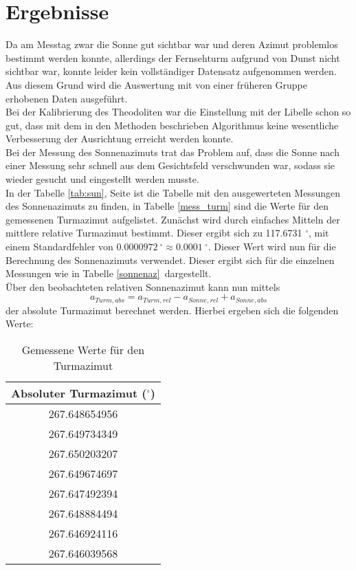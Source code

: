 \section{Ergebnisse}
Da am Messtag zwar die Sonne gut sichtbar war und deren Azimut problemlos bestimmt werden konnte, allerdings der Fernsehturm aufgrund von Dunst nicht sichtbar war, konnte leider kein vollständiger Datensatz aufgenommen werden. Aus diesem Grund wird die Auswertung mit von einer früheren Gruppe erhobenen Daten ausgeführt. \\
Bei der Kalibrierung des Theodoliten war die Einstellung mit der Libelle schon so gut, dass mit dem in den Methoden beschrieben Algorithmus keine wesentliche Verbesserung der Ausrichtung erreicht werden konnte. \\
Bei der Messung des Sonnenazimuts trat das Problem auf, dass die Sonne nach einer Messung sehr schnell aus dem Gesichtsfeld verschwunden war, sodass sie wieder gesucht und eingestellt werden musste. \\
In der Tabelle \ref{tab:sun}, Seite \pageref{tab:sun} ist die Tabelle mit den ausgewerteten Messungen des Sonnenazimuts zu finden, in Tabelle \ref{mess_turm} sind die Werte für den gemessenen Turmazimut aufgelistet. Zunächst wird durch einfaches Mitteln der mittlere relative Turmazimut bestimmt. Dieser ergibt sich zu 117.6731 $^\circ$, mit einem Standardfehler von $ 0.0000972 \ ^\circ \approx 0.0001 \ ^\circ$. Dieser Wert wird nun für die Berechnung des Sonnenazimuts verwendet. Dieser ergibt sich für die einzelnen Messungen wie in Tabelle \ref{sonnenaz}\ dargestellt. \\
Über den beobachteten relativen Sonnenazimut kann nun mittels 
\begin{equation}
a_{Turm,abs} = a_{Turm, rel} - a_{Sonne,rel} + a_{Sonne,abs} 
\end{equation}
der absolute Turmazimut berechnet werden. 
Hierbei ergeben sich die folgenden Werte: 
\begin{table}[h!]
\centering
\begin{tabular}{c}
Absoluter Turmazimut ($^\circ$)\\
\hline
267.648654956 \\
267.649734349 \\
267.650203207 \\
267.649674697 \\
267.647492394 \\
267.648884494 \\
267.646924116 \\
267.646039568 \\
\end{tabular}
\caption{Gemessene Werte für den Turmazimut}
\end{table}

